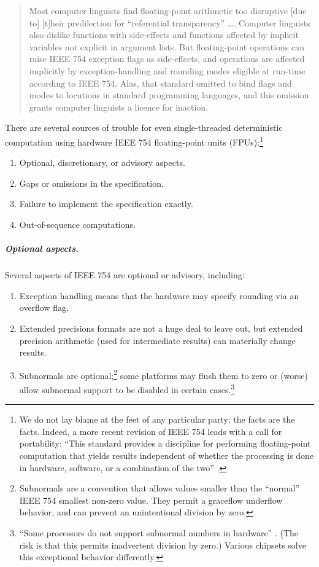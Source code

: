 \documentclass[twoside]{article}
\begin{document}
\begin{quote}
Most computer linguists find floating-point arithmetic too disruptive [due to] [t]heir predilection for “referential transparency” ….  Computer linguists also dislike functions with side-effects and functions affected by implicit variables not explicit in argument lists. But floating-point operations can raise IEEE 754 exception flags as side-effects, and operations are affected implicitly by exception-handling and rounding modes eligible at run-time according to IEEE 754. Alas, that standard omitted to bind flags and modes to locutions in standard programming languages, and this omission grants computer linguists a licence for inaction.  \citep{Kahan1997}
\end{quote}

There are several sources of trouble for even single-threaded deterministic computation using hardware IEEE 754 floating-point units (FPUs):\footnote{We do not lay blame at the feet of any particular party; the facts are the facts.  Indeed, a more recent revision of IEEE 754 leads with a call for portability:  “This standard provides a discipline for performing floating-point computation that yields results independent of whether the processing is done in hardware, software, or a combination of the two” \citep{IEEE754-2008}.}

\begin{enumerate}
  \item  Optional, discretionary, or advisory aspects.
  \item  Gaps or omissions in the specification.
  \item  Failure to implement the specification exactly.
  \item  Out-of-sequence computations.
\end{enumerate}

\subparagraph{Optional aspects.}

Several aspects of IEEE 754 are optional or advisory, including:

\begin{enumerate}
  \item  Exception handling means that the hardware may specify rounding via an overflow flag.
  \item  Extended precisions formats are not a huge deal to leave out, but extended precision arithmetic (used for intermediate results) can materially change results.
  \item  Subnormals are optional;\footnote{Subnormals are a convention that allows values smaller than the “normal” IEEE 754 smallest non-zero value.  They permit a graceflow underflow behavior, and can prevent an unintentional division by zero.} some platforms may flush them to zero or (worse) allow subnormal support to be disabled in certain cases.\footnote{“Some processors do not support subnormal numbers in hardware” \citep[p.~338]{Jones2008}.  (The risk is that this permits inadvertent division by zero.)  Various chipsets solve this exceptional behavior differently.}
\end{enumerate}
\end{document}
